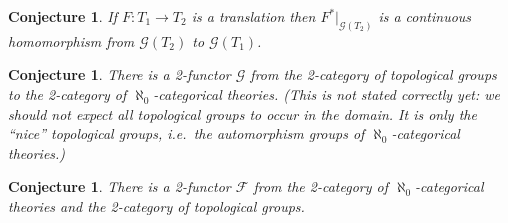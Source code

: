 \documentclass[12pt]{article}
\newtheorem{conj}[prop]{Conjecture}
\theoremstyle{definition}
\theoremstyle{remark}
\newcommand{\3}{\mathcal}
\begin{document}
\begin{conj} If $F:T_1\to T_2$ is a translation then
  $F^*|_{\3G (T_2)}$ is a continuous homomorphism from $\3G (T_2 )$ to
  $\3G (T_1)$. \end{conj}

\begin{conj} There is a 2-functor $\3G$ from the 2-category of
  topological groups to the 2-category of $\aleph _0$-categorical
  theories. (This is not stated correctly yet: we should not expect
  all topological groups to occur in the domain. It is only the
  ``nice'' topological groups, i.e.\ the automorphism groups of
  $\aleph _0$-categorical theories.) \end{conj}


\begin{conj} There is a 2-functor $\3F$ from the 2-category of
  $\aleph _0$-categorical theories and the 2-category of topological
  groups. \end{conj}







\printbibliography 
\end{document}
